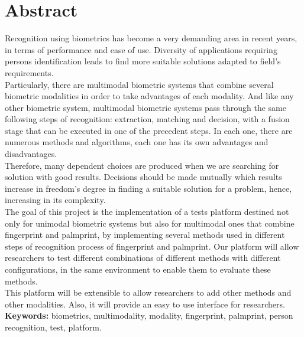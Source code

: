 \chapter*{Abstract}%
 
\label{} %


\tab Recognition using biometrics has become a very demanding area in recent years, in terms of performance and ease of use. Diversity of applications requiring persons identification leads to find more suitable solutions adapted to field's requirements.
\\ \tab Particularly, there are multimodal biometric systems that combine several biometric modalities in order to take advantages of each modality. And like any other biometric system, multimodal biometric systems pass through the same following steps of recognition: extraction, matching and decision, with a fusion stage that can be executed in one of the precedent steps. In each one, there are numerous methods and algorithms, each one has its own advantages and disadvantages.
\\ \tab Therefore, many dependent choices are produced when we are searching for solution with good results. Decisions should be made mutually which results increase in freedom's degree in finding a suitable solution for a problem, hence, increasing in its complexity.
\\ \tab The goal of this project is the implementation of a tests platform destined not only for unimodal biometric systems but also for multimodal ones that combine fingerprint and palmprint, by implementing several methods used in different steps of recognition process of fingerprint and palmprint. Our platform will allow researchers to test different combinations of different methods with different configurations, in the same environment to enable them to evaluate these methods.
\\ \tab This platform will be extensible to allow researchers to add other methods and other modalities. Also, it will provide an easy to use interface for researchers. \\
\tab \textbf{Keywords:} biometrics, multimodality, modality, fingerprint, palmprint, person recognition, test, platform.
